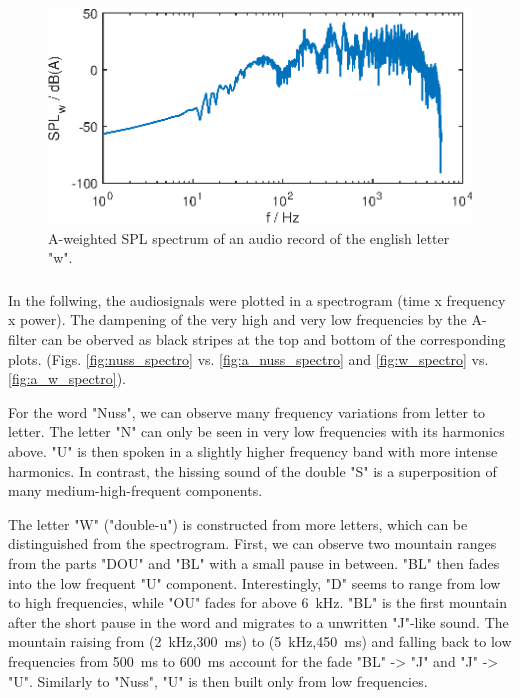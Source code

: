 \begin{figure}[h] 
  \centering
  \includegraphics[width=.9\linewidth]{ue2/sa_w_pegel.eps} %
  \caption{A-weighted SPL spectrum of an audio record of the english letter "w".}
  \label{fig:w_pegel_a}
\end{figure}
\clearpage

\subsubsection{}
In the follwing, the audiosignals were plotted in a spectrogram (time x frequency x power). The dampening of the very high and very low frequencies by the A-filter can be oberved as black stripes at the top and bottom of the corresponding plots. (Figs. \ref{fig:nuss_spectro} vs. \ref{fig:a_nuss_spectro} and \ref{fig:w_spectro} vs. \ref{fig:a_w_spectro}).

For the word "Nuss", we can observe many frequency variations from letter to letter. The letter "N" can only be seen in very low frequencies with its harmonics above. "U" is then spoken in a slightly higher frequency band with more intense harmonics. In contrast, the hissing sound of the double "S" is a superposition of many medium-high-frequent components.

The letter "W" ("double-u") is constructed from more letters, which can be distinguished from the spectrogram. First, we can observe two mountain ranges from the parts "DOU" and "BL" with a small pause in between. "BL" then fades into the low frequent "U" component. Interestingly, "D" seems to range from low to high frequencies, while "OU" fades for above \SI{6}{\kilo\Hz}. "BL" is the first mountain after the short pause in the word and migrates to a unwritten "J"-like sound. The mountain raising from (\SI{2}{\kilo\Hz},\SI{300}{\milli\second}) to (\SI{5}{\kilo\Hz},\SI{450}{\milli\second}) and falling back to low frequencies from \SI{500}{\milli\second} to \SI{600}{\milli\second} account for the fade "BL" -> "J" and "J" -> "U". Similarly to "Nuss", "U" is then built only from low frequencies.

